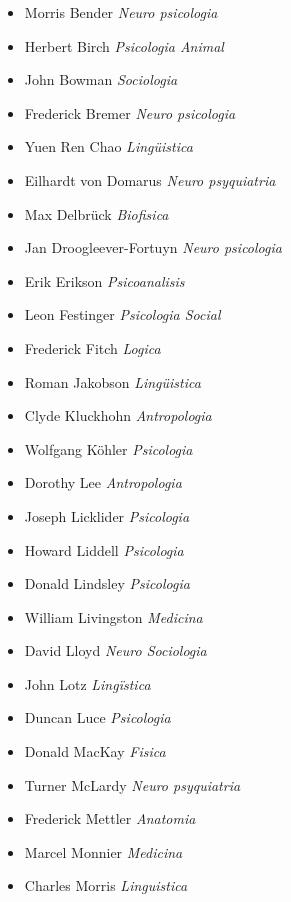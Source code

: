 \documentclass[a4paper,12pt]{article}
\begin{document}
\begin{itemize}
  \item Morris Bender {\itshape Neuro psicologia} 
  \item Herbert Birch {\itshape Psicologia Animal} 
  \item John Bowman {\itshape Sociologia} 
  \item Frederick Bremer {\itshape Neuro psicologia} 
  \item Yuen Ren Chao {\itshape Ling\"uistica} 
  \item Eilhardt von Domarus {\itshape Neuro psyquiatria} 
  \item Max Delbr\"uck {\itshape Biofisica} 
  \item Jan Droogleever-Fortuyn {\itshape Neuro psicologia} 
  \item Erik Erikson {\itshape Psicoanalisis} 
  \item Leon Festinger {\itshape Psicologia Social}
  \item Frederick Fitch {\itshape Logica} 
  \item Roman Jakobson {\itshape Ling\"uistica} 
  \item Clyde Kluckhohn {\itshape Antropologia} 
  \item Wolfgang K\"ohler {\itshape Psicologia} 
  \item Dorothy Lee {\itshape Antropologia} 
  \item Joseph Licklider {\itshape Psicologia} 
  \item Howard Liddell {\itshape Psicologia} 
  \item Donald Lindsley {\itshape Psicologia} 
  \item William Livingston {\itshape Medicina} 
  \item David Lloyd {\itshape Neuro Sociologia} 
  \item John Lotz {\itshape Ling\"istica} 
  \item Duncan Luce {\itshape Psicologia} 
  \item Donald MacKay {\itshape Fisica} 
  \item Turner McLardy {\itshape Neuro psyquiatria} 
  \item Frederick Mettler {\itshape Anatomia}
  \item Marcel Monnier {\itshape Medicina} 
  \item Charles Morris {\itshape Linguistica} 
  
\end{itemize}
\end{document}

